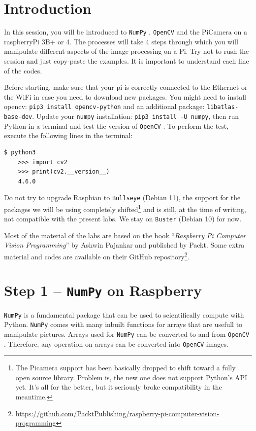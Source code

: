 \documentclass{labo}
\author{}
\newcommand{\numpy}{\texttt{NumPy} }
\newcommand{\opencv}{\texttt{OpenCV} }
\begin{document}

\section*{Introduction}
In this session, you will be introduced to \numpy, \opencv and the PiCamera on a raspberryPi 3B+ or 4. The processes will take 4 steps through which you will manipulate different aspects of the image processing on a Pi. Try not to rush the session and just copy-paste the examples. It is important to understand each line of the codes.

Before starting, make sure that your pi is correctly connected to the Ethernet or the WiFi in case you need to download new packages.
You might need to install opencv: \texttt{pip3 install opencv-python} and an additional package: \texttt{libatlas-base-dev}.
Update your \texttt{numpy} installation: \texttt{pip3 install -U numpy}, then run Python in a terminal and test the version of \opencv. To perform the test, execute the following lines in the terminal:

\begin{verbatim}
$ python3
	>>> import cv2
	>>> print(cv2.__version__)
	4.6.0
\end{verbatim}

Do not try to upgrade Raspbian to \texttt{Bullseye} (Debian 11), the support for the packages we will be using completely shifted\footnote{The Picamera support has been basically dropped to shift toward a fully open source library. Problem is, the new one does not support Python's API yet. It's all for the better, but it seriously broke compatibility in the meantime.} and is still, at the time of writing, not compatible with the present labs. We stay on \texttt{Buster} (Debian 10) for now.

Most of the material of the labs are based on the book ``\textit{Raspberry Pi Computer Vision Programming}'' by Ashwin Pajankar and published by Packt. Some extra material and codes are available on their GitHub repository\footnote{\url{https://github.com/PacktPublishing/raspberry-pi-computer-vision-programming}}.


\section*{Step 1 -- \texttt{NumPy} on Raspberry}
\numpy is a fundamental package that can be used to scientifically compute with Python. \numpy comes with many inbuilt functions for arrays that are usefull to manipulate pictures. Arrays used for \numpy can be converted to and from \opencv. Therefore, any operation on arrays can be converted into \opencv images.
\end{document}

